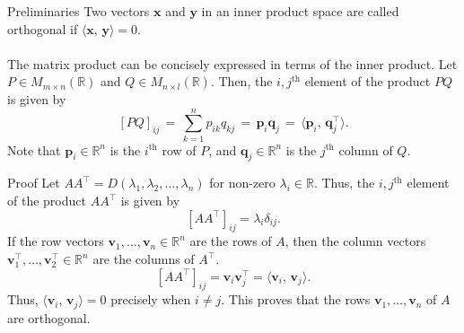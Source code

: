 \documentclass{beamer}
\def\x{\bm{x}}
\def\y{\bm{y}}
\def\v{\bm{v}}
\def\p{\bm{p}}
\def\q{\bm{q}}
\newcommand\ip[2]{\langle #1,\, #2 \rangle}
\begin{document}
        \begin{frame}{Preliminaries}
                Two vectors $\x$ and $\y$ in an inner product space are called orthogonal if $\ip{\x}{\y} = 0$. \\~\\
                \pause
                The matrix product can be concisely expressed in terms of the inner product. Let $P \in M_{m \times n}(\mathbb{R})$
                and $Q \in M_{n \times l}(\mathbb{R})$. Then, the $i, j^\text{th}$ element of the product $PQ$ is given by
                \[
                        [PQ]_{ij} \,=\, \sum_{k = 1}^n p_{ik}q_{kj} \,=\, \p_i\q_j \,=\, \ip{\p_i}{\q_j^\top}.
                \]
                Note that $\p_i \in \mathbb{R}^n$ is the $i^\text{th}$ row of $P$, and $\q_j \in \mathbb{R}^n$ is the $j^\text{th}$
                column of $Q$.
        \end{frame}

        \begin{frame}{Proof}
                Let $A A^\top = D(\lambda_1, \lambda_2, \dots, \lambda_n)$ for non-zero $\lambda_i \in \mathbb{R}$.
                Thus, the $i, j^\text{th}$ element of the product $A A^\top$ is given by
                \[
                        [A A^\top]_{ij} = \lambda_i\delta_{ij}.
                \] 
                \pause
                If the row vectors $\v_1, \dots, \v_n \in \mathbb{R}^n$ are the rows of $A$, then the column vectors
                $\v_1^\top, \dots, \v_2^\top \in \mathbb{R}^n$ are the columns of $A^\top$.
                \[
                        [A A^\top]_{ij} = \v_i\v_j^\top = \ip{\v_i}{\v_j}.
                \]
                \pause
                Thus, $\ip{\v_i}{\v_j} = 0$ precisely when $i \neq j$. This proves that the rows $\v_1, \dots, \v_n$ of $A$
                are orthogonal.
        \end{frame}
\end{document}
